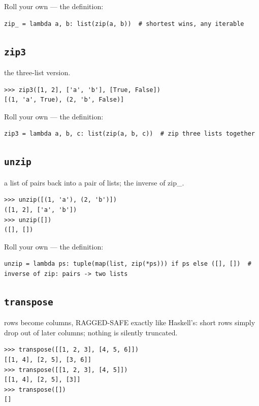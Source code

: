\documentclass[10pt,letterpaper]{book}
\begin{document}
Roll your own --- the definition:

\begin{lstlisting}[style=ex]
zip_ = lambda a, b: list(zip(a, b))  # shortest wins, any iterable
\end{lstlisting}

\subsection{\texttt{zip3}}\label{def:zip3}
the three-list version.
\begin{lstlisting}[style=ex]
>>> zip3([1, 2], ['a', 'b'], [True, False])
[(1, 'a', True), (2, 'b', False)]
\end{lstlisting}

Roll your own --- the definition:

\begin{lstlisting}[style=ex]
zip3 = lambda a, b, c: list(zip(a, b, c))  # zip three lists together
\end{lstlisting}
\subsection{\texttt{unzip}}\label{def:unzip}
a list of pairs back into a pair of lists; the inverse of zip\_.
\begin{lstlisting}[style=ex]
>>> unzip([(1, 'a'), (2, 'b')])
([1, 2], ['a', 'b'])
>>> unzip([])
([], [])
\end{lstlisting}

Roll your own --- the definition:

\begin{lstlisting}[style=ex]
unzip = lambda ps: tuple(map(list, zip(*ps))) if ps else ([], [])  # inverse of zip: pairs -> two lists
\end{lstlisting}
\subsection{\texttt{transpose}}\label{def:transpose}
rows become columns, RAGGED-SAFE exactly like Haskell's: short rows simply drop out of later columns; nothing is silently truncated.
\begin{lstlisting}[style=ex]
>>> transpose([[1, 2, 3], [4, 5, 6]])
[[1, 4], [2, 5], [3, 6]]
>>> transpose([[1, 2, 3], [4, 5]])
[[1, 4], [2, 5], [3]]
>>> transpose([])
[]
\end{lstlisting}
\end{document}
